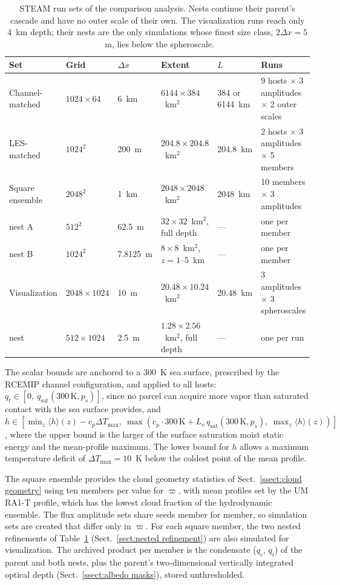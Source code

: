\documentclass{article}
\begin{document}
\begin{table}
\centering
\small
\setlength{\tabcolsep}{4pt}
\begin{tabular}{llllll}
\hline
Set & Grid & $\Delta x$ & Extent & $L$ & Runs \\
\hline
Channel-matched & $1024\times 64$ & 6~km & $6144\times 384$~km$^2$ & 384 or 6144~km & 9 hosts $\times$ 3 amplitudes $\times$ 2 outer scales \\
LES-matched & $1024^2$ & 200~m & $204.8\times 204.8$~km$^2$ & 204.8~km & 2 hosts $\times$ 3 amplitudes $\times$ 5 members \\
Square ensemble & $2048^2$ & 1~km & $2048\times 2048$~km$^2$ & 2048~km & 10 members $\times$ 3 amplitudes \\
\quad nest A & $512^2$ & 62.5~m & $32\times 32$~km$^2$, full depth & --- & one per member \\
\quad nest B & $1024^2$ & 7.8125~m & $8\times 8$~km$^2$, $z = 1$--5~km & --- & one per member \\
Visualization & $2048\times 1024$ & 10~m & $20.48\times 10.24$~km$^2$ & 20.48~km & 3 amplitudes $\times$ 3 spheroscales \\
\quad nest & $512\times 1024$ & 2.5~m & $1.28\times 2.56$~km$^2$, full depth & --- & one per run \\
\hline
\end{tabular}
\caption{STEAM run sets of the comparison analysis. Nests continue
their parent's cascade and have no outer scale of their own. The
visualization runs reach only 4~km depth; their nests are the only
simulations whose finest size class, $2\Delta x = 5$~m, lies below the
spheroscale.}\label{tab:steam runs}
\end{table}

The scalar bounds are anchored to a 300~K sea surface, prescribed by the RCEMIP channel configuration, and
applied to all hosts: $q_t \in [0,\
q_{\mathrm{sat}}(300\,\mathrm{K}, p_s)]$, since no parcel can acquire
more vapor than saturated contact with the sea surface provides, and
$h \in [\min_z \langle h \rangle(z) - c_p \Delta T_{\max},\
\max(c_p \cdot 300\,\mathrm{K} + L_v\,
q_{\mathrm{sat}}(300\,\mathrm{K}, p_s),\ \max_z \langle h
\rangle(z))]$, where the upper bound is the larger of the surface
saturation moist static energy and the mean-profile maximum. The
lower bound for $h$ allows a maximum temperature deficit of
$\Delta T_{\max} = 10$~K below the coldest point of the mean profile.

The square ensemble provides the cloud geometry statistics of Sect.~\ref{ssect:cloud geometry} using ten
members per value for $\varpi$, with mean profiles set by the UM RA1-T profile, which has the lowest cloud fraction of the hydrodynamic ensemble. The flux amplitude sets share seeds
member for member, so simulation sets are created that differ only in $\varpi$. For each square member, 
the two nested refinements of Table~\ref{tab:steam runs}
(Sect.~\ref{sect:nested refinement}) are also simulated for visualization. The archived product per member is
the condensate ($q_c$, $q_i$) of the parent and both nests, plus the
parent's two-dimensional vertically integrated optical depth
(Sect.~\ref{ssect:albedo masks}), stored unthresholded.
\end{document}

